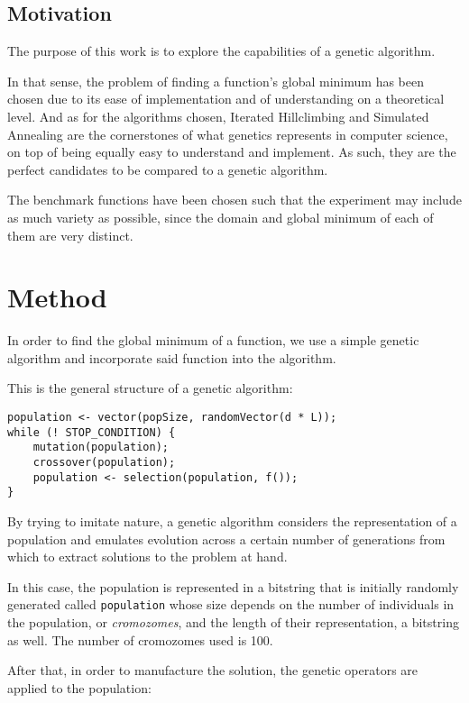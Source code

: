 \documentclass{article}
\begin{document}
\subsection{Motivation} 
The purpose of this work is to explore the capabilities of a genetic algorithm.

In that sense, the problem of finding a function's global minimum has been 
chosen due to its ease of implementation and of understanding on a theoretical 
level. And as for the algorithms chosen, Iterated Hillclimbing and Simulated 
Annealing are the cornerstones of what genetics represents in computer 
science, on top of being equally easy to understand and implement. As such,
they are the perfect candidates to be compared to a genetic algorithm.

The benchmark functions have been chosen such that the experiment may include 
as much variety as possible, since the domain and global minimum of each of 
them are very distinct.

\section{Method}
In order to find the global minimum of a function, we use a simple genetic
algorithm and incorporate said function into the algorithm.

This is the general structure of a genetic algorithm:

\begin{lstlisting}
population <- vector(popSize, randomVector(d * L));
while (! STOP_CONDITION) {
    mutation(population);
    crossover(population);
    population <- selection(population, f());
}
\end{lstlisting}

By trying to imitate nature, a genetic algorithm considers the representation
of a population and emulates evolution across a certain number of generations
from which to extract solutions to the problem at hand.

In this case, the population is represented in a bitstring that is initially 
randomly generated called \texttt{population} whose size depends on the number of 
individuals in the population, or \textit{cromozomes}, and the length of their 
representation, a bitstring as well. The number of cromozomes used is 100.

After that, in order to manufacture the solution, the genetic operators are
applied to the population:
\end{document}
